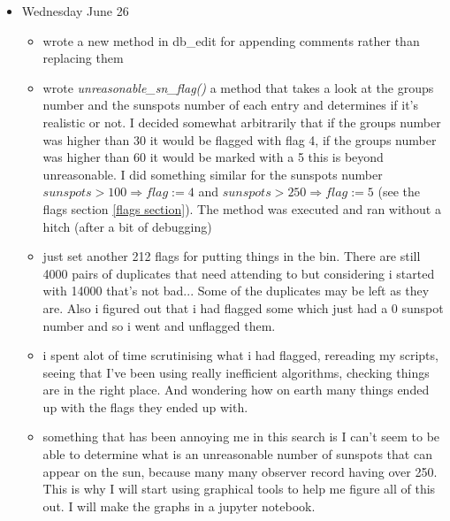 \documentclass[12pt]{article}
\begin{document}
\begin{itemize}
\item Wednesday June 26
    \begin{itemize}
        \item wrote a new method in db\_edit for appending comments rather than replacing them
        \item wrote \textit{unreasonable\_sn\_flag()} a method that takes a look at the groups number and the sunspots number of each entry and determines if it's realistic or not. I decided somewhat arbitrarily that if the groups number was higher than 30 it would be flagged with flag 4, if the groups number was higher than 60 it would be marked with a 5 this is beyond unreasonable. I did something similar for the sunspots number $sunspots>100\Rightarrow flag:=4$ and $sunspots>250\Rightarrow flag:=5$ (see the flags section \ref{flags section}). The method was executed and ran without a hitch (after a bit of debugging)
        \item just set another 212 flags for putting things in the bin. There are still 4000 pairs of duplicates that need attending to but considering i started with 14000 that's not bad... Some of the duplicates may be left as they are. Also i figured out that i had flagged some which just had a 0 sunspot number and so i went and unflagged them.
        \item i spent alot of time scrutinising what i had flagged, rereading my scripts, seeing that I've been using really inefficient algorithms, checking things are in the right place. And wondering how on earth many things ended up with the flags they ended up with.
        \item something that has been annoying me in this search is I can't seem to be able to determine what is an unreasonable number of sunspots that can appear on the sun, because many many observer record having over 250. This is why I will start using graphical tools to help me figure all of this out. I will make the graphs in a jupyter notebook.
    \end{itemize}
    

\end{itemize}
\end{document}
